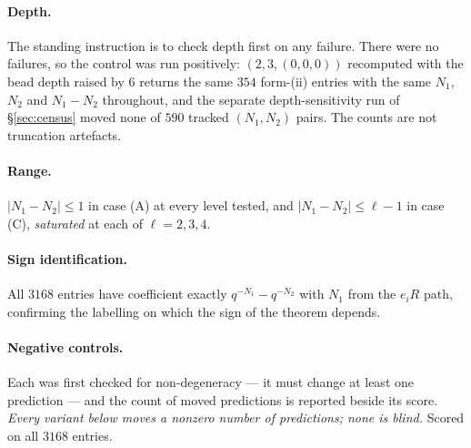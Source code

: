 \documentclass[11pt]{article}
\theoremstyle{definition}
\theoremstyle{remark}
\begin{document}
\paragraph{Depth.} The standing instruction is to check depth first on any failure.
There were no failures, so the control was run positively: $(2,3,(0,0,0))$ recomputed
with the bead depth raised by $6$ returns the same $354$ form-(ii) entries with the same
$N_1$, $N_2$ and $N_1-N_2$ throughout, and the separate depth-sensitivity run of
\S\ref{sec:census} moved none of $590$ tracked $(N_1,N_2)$ pairs. The counts are not
truncation artefacts.

\paragraph{Range.} $|N_1-N_2|\le1$ in case (A) at every level tested, and
$|N_1-N_2|\le\ell-1$ in case (C), \emph{saturated} at each of $\ell=2,3,4$.

\paragraph{Sign identification.} All $3168$ entries have coefficient exactly
$q^{-N_1}-q^{-N_2}$ with $N_1$ from the $e_iR$ path, confirming the labelling on which
the sign of the theorem depends.

\paragraph{Negative controls.} Each was first checked for non-degeneracy --- it must
change at least one prediction --- and the count of moved predictions is reported
beside its score. \emph{Every variant below moves a nonzero number of predictions;
none is blind.} Scored on all $3168$ entries.
\end{document}
